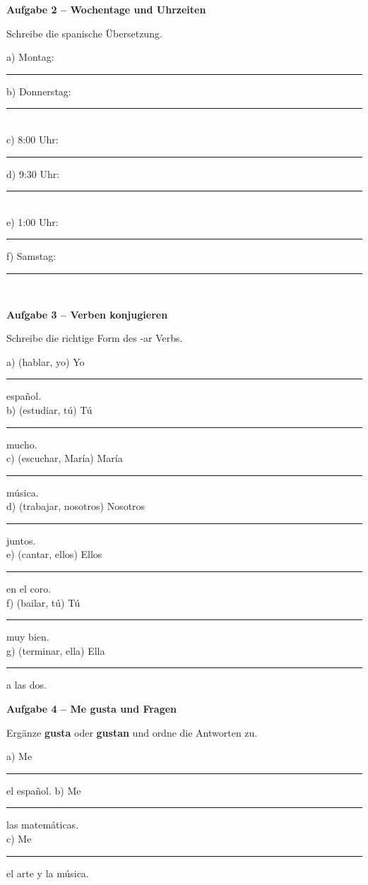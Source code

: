 \documentclass[11pt, a4paper]{article}
\newcommand{\fachfarbe}{spanisch}
\newcommand{\punktebox}[1]{\hfill\fbox{\small \_\_\_/#1}}
\newcommand{\luecke}[1]{\rule{#1}{0.4pt}}
\newenvironment{aufgabe}[1]{%
    \vspace{12pt}
    \noindent\textbf{\textcolor{\fachfarbe}{Aufgabe #1}}
    \vspace{6pt}
    \begin{list}{}{\leftmargin=0pt}
    \item[]
}{%
    \end{list}
}
\newcommand{\es}[1]{\textcolor{\fachfarbe}{\textbf{#1}}}
\begin{document}
\begin{aufgabe}{2 -- Wochentage und Uhrzeiten}
Schreibe die spanische Übersetzung. \punktebox{6}
\end{aufgabe}

\noindent
a) Montag: \luecke{3cm} \hfill
b) Donnerstag: \luecke{3cm} \\[0.8em]
c) 8:00 Uhr: \luecke{4cm} \hfill
d) 9:30 Uhr: \luecke{4cm} \\[0.8em]
e) 1:00 Uhr: \luecke{4cm} \hfill
f) Samstag: \luecke{3cm} \\

\vspace{12pt}


\begin{aufgabe}{3 -- Verben konjugieren}
Schreibe die richtige Form des -ar Verbs. \punktebox{7}
\end{aufgabe}

\noindent
a) (hablar, yo) Yo \luecke{2.5cm} español.\\[0.7em]
b) (estudiar, tú) Tú \luecke{2.5cm} mucho.\\[0.7em]
c) (escuchar, María) María \luecke{2.5cm} música.\\[0.7em]
d) (trabajar, nosotros) Nosotros \luecke{2.5cm} juntos.\\[0.7em]
e) (cantar, ellos) Ellos \luecke{2.5cm} en el coro.\\[0.7em]
f) (bailar, tú) Tú \luecke{2.5cm} muy bien.\\[0.7em]
g) (terminar, ella) Ella \luecke{2.5cm} a las dos.\\

\vspace{12pt}


\begin{aufgabe}{4 -- Me gusta und Fragen}
Ergänze \es{gusta} oder \es{gustan} und ordne die Antworten zu. \punktebox{6}
\end{aufgabe}

\noindent
a) Me \luecke{2cm} el español. \hfill
b) Me \luecke{2cm} las matemáticas. \\[0.8em]
c) Me \luecke{2cm} el arte y la música.\\[1em]
\end{document}
